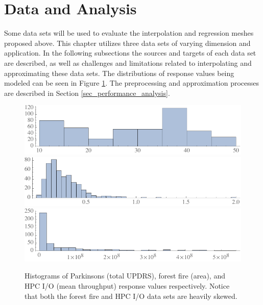 

\section{Data and Analysis}

Some data sets will be used to evaluate the interpolation and regression meshes proposed above. This chapter utilizes three data sets of varying dimension and application. In the following subsections the sources and targets of each data set are described, as well as challenges and limitations related to interpolating and approximating these data sets. The distributions of response values being modeled can be seen in Figure \ref{fig_response_hists}. The preprocessing and approximation processes are described in Section \ref{sec_performance_analysis}.

\begin{figure}
  \centering
  \includegraphics[width=.8\textwidth]{Figures/ACM/p-hist.pdf}
  \includegraphics[width=.8\textwidth]{Figures/ACM/f-hist.pdf}
  \includegraphics[width=.8\textwidth]{Figures/ACM/h-hist.pdf}
  \caption{Histograms of Parkinsons (total UPDRS), forest fire (area), and HPC I/O (mean throughput) response values respectively. Notice that both the forest fire and HPC I/O data sets are heavily skewed.
  \vspace{-.5cm}}
  \label{fig_response_hists}
\end{figure}

